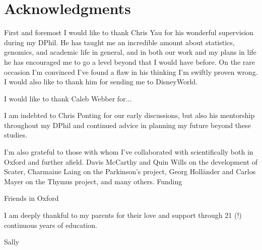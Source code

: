 
%
%

\bigskip

\begingroup
\let\clearpage\relax
\let\cleardoublepage\relax
\let\cleardoublepage\relax
\chapter*{Acknowledgments}
First and foremost I would like to thank Chris Yau for his wonderful supervision during my DPhil. 
He has taught me an incredible amount about statistics, genomics, and academic life in general, and in both our work and my plans in life he has encouraged me to go a level beyond that I would have before. On the rare occasion I'm convinced I've found a flaw in his thinking I'm swiftly proven wrong. I would also like to thank him for sending me to DisneyWorld.

I would like to thank Caleb Webber for...

I am indebted to Chris Ponting for our early discussions, but also his mentorship throughout my DPhil and continued advice in planning my future beyond these studies.

I'm also grateful to those with whom I've collaborated with scientifically both in Oxford and further afield. Davis McCarthy and Quin Wills on the development of Scater, Charmaine Laing on the Parkinson's project, Georg Holl{\"a}nder and Carlos Mayer on the Thymus project, and many others.
Funding

Friends in Oxford

I am deeply thankful to my parents for their love and support through 21 (!) continuous years of education.

Sally


\endgroup
